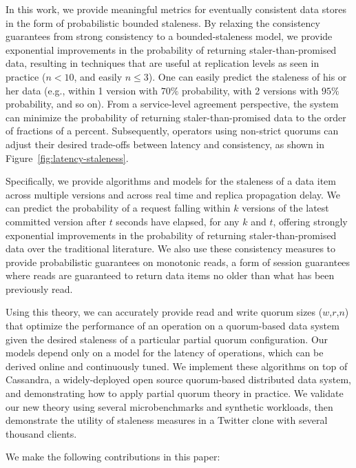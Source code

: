 \documentclass{vldb}
\begin{document}
In this work, we provide meaningful metrics for eventually consistent
data stores in the form of probabilistic bounded staleness.  By
relaxing the consistency guarantees from strong consistency to a
bounded-staleness model, we provide exponential improvements in the
probability of returning staler-than-promised data, resulting in
techniques that are useful at replication levels as seen in practice
($n<10$, and easily $n\leq3$).  One can easily predict the staleness
of his or her data (e.g., within 1 version with $70\%$ probability,
with 2 versions with $95\%$ probability, and so on).  From a
service-level agreement perspective, the system can minimize the
probability of returning staler-than-promised data to the order of
fractions of a percent.  Subsequently, operators using non-strict
quorums can adjust their desired trade-offs between latency and
consistency, as shown in Figure~\ref{fig:latency-staleness}.

Specifically, we provide algorithms and models for the staleness of a
data item across multiple versions and across real time and replica
propagation delay.  We can predict the probability of a request
falling within $k$ versions of the latest committed version after $t$
seconds have elapsed, for any $k$ and $t$, offering strongly
exponential improvements in the probability of returning
staler-than-promised data over the traditional literature.  We also
use these consistency measures to provide probabilistic guarantees on
monotonic reads, a form of session guarantees where reads are
guaranteed to return data items no older than what has been previously
read.

Using this theory, we can accurately provide read and write quorum
sizes ($w$,$r$,$n$) that optimize the performance of an operation on a
quorum-based data system given the desired staleness of a particular
partial quorum configuration.  Our models depend only on a model for
the latency of operations, which can be derived online and
continuously tuned.  We implement these algorithms on top of
Cassandra, a widely-deployed open source quorum-based distributed
data system, and demonstrating how to apply partial quorum theory in
practice.  We validate our new theory using several microbenchmarks
and synthetic workloads, then demonstrate the utility of staleness
measures in a Twitter clone with several thousand clients.

We make the following contributions in this paper:
\end{document}
